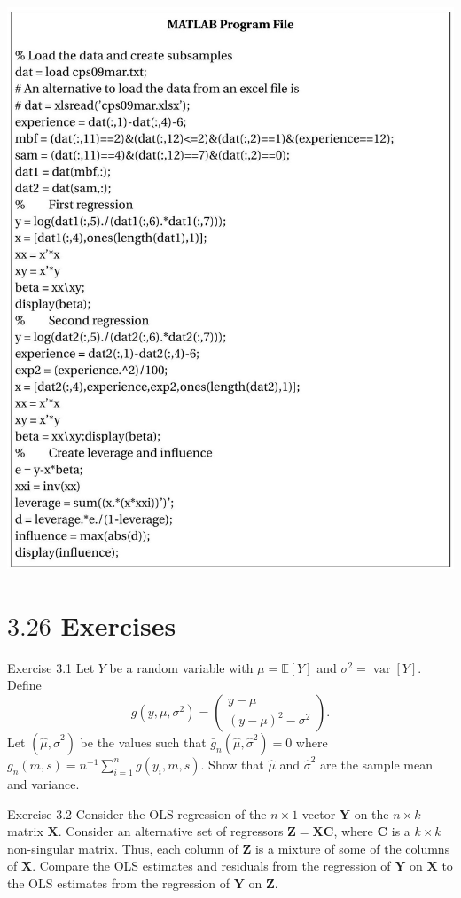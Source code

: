 \documentclass[10pt]{article}
\begin{document}
\includegraphics[max width=\textwidth]{2022_09_17_333a3ece3fb3afcc15d0g-33}

\section{$3.26$ Exercises}
Exercise 3.1 Let $Y$ be a random variable with $\mu=\mathbb{E}[Y]$ and $\sigma^{2}=\operatorname{var}[Y]$. Define
$$
g\left(y, \mu, \sigma^{2}\right)=\left(\begin{array}{c}
y-\mu \\
(y-\mu)^{2}-\sigma^{2}
\end{array}\right) .
$$
Let $\left(\widehat{\mu}, \widehat{\sigma}^{2}\right)$ be the values such that $\bar{g}_{n}\left(\widehat{\mu}, \widehat{\sigma}^{2}\right)=0$ where $\bar{g}_{n}(m, s)=n^{-1} \sum_{i=1}^{n} g\left(y_{i}, m, s\right)$. Show that $\widehat{\mu}$ and $\widehat{\sigma}^{2}$ are the sample mean and variance.

Exercise 3.2 Consider the OLS regression of the $n \times 1$ vector $\boldsymbol{Y}$ on the $n \times k$ matrix $\boldsymbol{X}$. Consider an alternative set of regressors $\boldsymbol{Z}=\boldsymbol{X} \boldsymbol{C}$, where $\boldsymbol{C}$ is a $k \times k$ non-singular matrix. Thus, each column of $\boldsymbol{Z}$ is a mixture of some of the columns of $\boldsymbol{X}$. Compare the OLS estimates and residuals from the regression of $\boldsymbol{Y}$ on $\boldsymbol{X}$ to the OLS estimates from the regression of $\boldsymbol{Y}$ on $\boldsymbol{Z}$.
\end{document}
